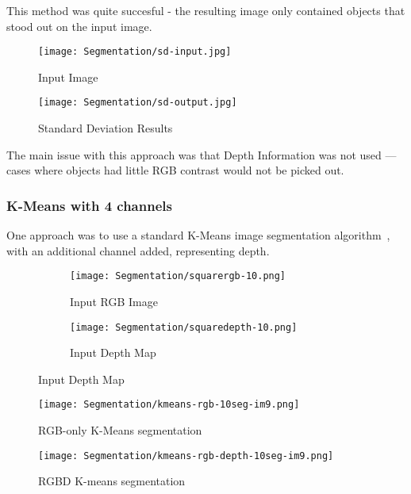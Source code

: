 This method was quite succesful - the resulting image only contained objects that stood out on the input image.

\begin{figure}[H]
    \centering
    \texttt{[image: Segmentation/sd-input.jpg]}
    \caption{Input Image}
\end{figure}

\begin{figure}[H]
   \centering
   \texttt{[image: Segmentation/sd-output.jpg]}
   \caption{Standard Deviation Results}

\end{figure}

The main issue with this approach was that Depth Information was not used --- cases where objects had little RGB contrast would not be picked out. 

\subsubsection{K-Means with 4 channels}
One approach was to use a standard K-Means image segmentation algorithm~\cite{kmeans-matlab}, with an additional channel added, representing depth. 

\begin{figure}[H]
    \centering
    \begin{subfigure}[b]{0.45\textwidth}
        \centering
        \texttt{[image: Segmentation/squarergb-10.png]}
        \caption{Input RGB Image}
    \end{subfigure}
    \hfill
    \begin{subfigure}[b]{0.45\textwidth}
        \centering
        \texttt{[image: Segmentation/squaredepth-10.png]}
        \caption{Input Depth Map}
    \end{subfigure}
\end{figure}

\begin{figure}[H]
    \centering
    \texttt{[image: Segmentation/kmeans-rgb-10seg-im9.png]}
    \caption{RGB-only K-Means segmentation}
\end{figure}

\begin{figure}[H]
    \centering
    \texttt{[image: Segmentation/kmeans-rgb-depth-10seg-im9.png]}
    \caption{RGBD K-means segmentation}
\end{figure}

